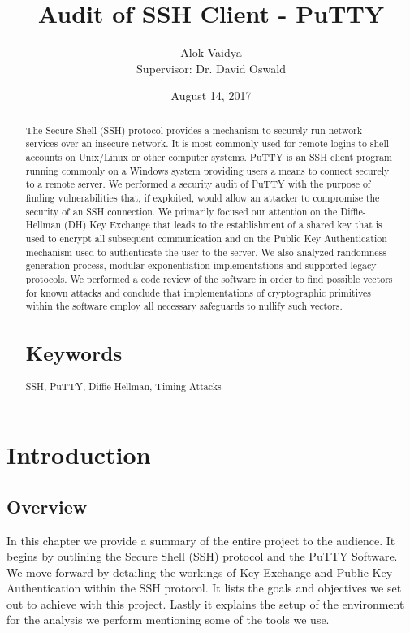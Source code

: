 \documentclass{report}
\title{Audit of SSH Client - PuTTY}
\author{Alok Vaidya\\[1cm]{\large Supervisor: Dr. David Oswald}}
\date{August 14, 2017}
\begin{document}
\maketitle
\tableofcontents
\begin{abstract}
The Secure Shell (SSH) protocol provides a mechanism to securely run network services over an insecure network. It is most commonly used for remote logins to shell accounts on Unix/Linux or other computer systems. PuTTY is an SSH client program running commonly on a Windows system providing users a means to connect securely to a remote server. We performed a security audit of PuTTY with the purpose of finding vulnerabilities that, if exploited, would allow an attacker to compromise the security of an SSH connection. We primarily focused our attention on the Diffie-Hellman (DH) Key Exchange that leads to the establishment of a shared key that is used to encrypt all subsequent communication and on the Public Key Authentication mechanism used to authenticate the user to the server. We also analyzed randomness generation process, modular exponentiation implementations and supported legacy protocols. We performed a code review of the software in order to find possible vectors for known attacks and conclude that implementations of cryptographic primitives within the software employ all necessary safeguards to nullify such vectors.
\section{Keywords}
SSH, PuTTY, Diffie-Hellman, Timing Attacks
\end{abstract}
\chapter{Introduction}
\section{Overview}
In this chapter we provide a summary of the entire project to the audience. It begins by outlining the Secure Shell (SSH) protocol and the PuTTY Software. We move forward by detailing the workings of Key Exchange and Public Key Authentication within the SSH protocol. It lists the goals and objectives we set out to achieve with this project. Lastly it explains the setup of the environment for the analysis we perform mentioning some of the tools we use.
\end{document}

